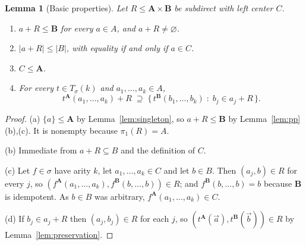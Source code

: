 \documentclass[11pt]{article}
\theoremstyle{mainplain}
\newtheorem{lemma}[theorem]{Lemma}
\theoremstyle{mainroman}
\theoremstyle{definition}
\newcommand{\alphlabels}{\renewcommand{\labelenumi}{\textup{(\alph{enumi})}}%
  \renewcommand{\theenumi}{\alph{enumi}}}
\providecommand{\tightlist}{\setlength{\itemsep}{0pt}\setlength{\parskip}{0pt}}
\numberwithin{equation}{section}
\newcommand{\bA}{\mathbf A}
\newcommand{\bB}{\mathbf B}
\newcommand{\Tm}{T_\sigma}
\begin{document}
\begin{lemma}[Basic properties]\label{lem:center-basic}
Let $R\le\bA\times\bB$ be subdirect with left center $C$.
\begin{enumerate}\alphlabels\tightlist
\item $a+R\le\bB$ for every $a\in A$, and $a+R\ne\varnothing$.
\item $|a+R|\le|B|$, with equality if and only if $a\in C$.
\item $C\le\bA$.
\item For every $t\in\Tm(k)$ and $a_1,\dots,a_k\in A$,
      \[
        t^{\bA}(a_1,\dots,a_k)+R\;\supseteq\;
        \bigl\{\,t^{\bB}(b_1,\dots,b_k)\;:\;b_j\in a_j+R\,\bigr\}.
      \]
\end{enumerate}
\end{lemma}
\begin{proof}
(a) $\{a\}\le\bA$ by Lemma~\ref{lem:singleton}, so $a+R\le\bB$ by
Lemma~\ref{lem:pp}(b),(c). It is nonempty because $\pi_1(R)=A$.

(b) Immediate from $a+R\subseteq B$ and the definition of $C$.

(c) Let $f\in\sigma$ have arity $k$, let $a_1,\dots,a_k\in C$ and let $b\in B$.
Then $(a_j,b)\in R$ for every $j$, so
$(f^{\bA}(a_1,\dots,a_k),f^{\bB}(b,\dots,b))\in R$; and
$f^{\bB}(b,\dots,b)=b$ because $\bB$ is idempotent. As $b\in B$ was arbitrary,
$f^{\bA}(a_1,\dots,a_k)\in C$.

(d) If $b_j\in a_j+R$ then $(a_j,b_j)\in R$ for each $j$, so
$(t^{\bA}(\vec a),t^{\bB}(\vec b))\in R$ by Lemma~\ref{lem:preservation}.
\end{proof}
\end{document}
